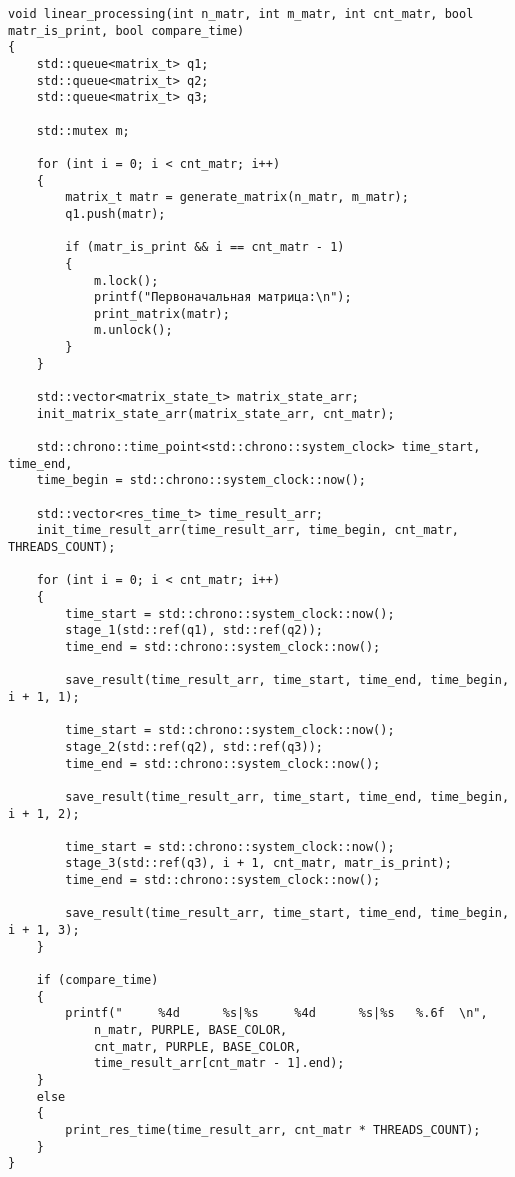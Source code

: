 \begin{center}
\captionsetup{justification=raggedright,singlelinecheck=off}
\begin{lstlisting}[label=lst:linear_processing,caption=Функция алгоритма линейной обработки матрицы]
void linear_processing(int n_matr, int m_matr, int cnt_matr, bool matr_is_print, bool compare_time)
{
	std::queue<matrix_t> q1;
	std::queue<matrix_t> q2;
	std::queue<matrix_t> q3;

	std::mutex m;

	for (int i = 0; i < cnt_matr; i++)
	{
		matrix_t matr = generate_matrix(n_matr, m_matr);
		q1.push(matr);

		if (matr_is_print && i == cnt_matr - 1)
		{
			m.lock();
			printf("Первоначальная матрица:\n");
			print_matrix(matr);
			m.unlock();
		}
	}

	std::vector<matrix_state_t> matrix_state_arr;
	init_matrix_state_arr(matrix_state_arr, cnt_matr);

	std::chrono::time_point<std::chrono::system_clock> time_start, time_end, 
	time_begin = std::chrono::system_clock::now();

	std::vector<res_time_t> time_result_arr;
	init_time_result_arr(time_result_arr, time_begin, cnt_matr, THREADS_COUNT);

	for (int i = 0; i < cnt_matr; i++)
	{
		time_start = std::chrono::system_clock::now();
		stage_1(std::ref(q1), std::ref(q2));
		time_end = std::chrono::system_clock::now();
		
		save_result(time_result_arr, time_start, time_end, time_begin, i + 1, 1);

		time_start = std::chrono::system_clock::now();
		stage_2(std::ref(q2), std::ref(q3));
		time_end = std::chrono::system_clock::now();

		save_result(time_result_arr, time_start, time_end, time_begin, i + 1, 2);

		time_start = std::chrono::system_clock::now();
		stage_3(std::ref(q3), i + 1, cnt_matr, matr_is_print);
		time_end = std::chrono::system_clock::now();

		save_result(time_result_arr, time_start, time_end, time_begin, i + 1, 3);
	}

	if (compare_time)
	{
		printf("     %4d      %s|%s     %4d      %s|%s   %.6f  \n",
			n_matr, PURPLE, BASE_COLOR, 
			cnt_matr, PURPLE, BASE_COLOR,
			time_result_arr[cnt_matr - 1].end);
	}
	else
	{
		print_res_time(time_result_arr, cnt_matr * THREADS_COUNT);
	}
}
\end{lstlisting}
\end{center}


